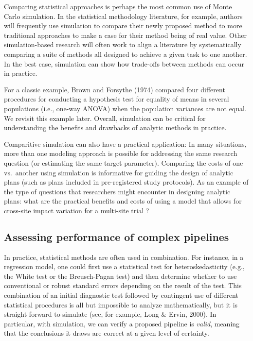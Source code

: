 \documentclass[
]{book}
\begin{document}
Comparing statistical approaches is perhaps the most common use of Monte Carlo simulation.
In the statistical methodology literature, for example, authors will frequently use simulation to compare their newly proposed method to more traditional approaches to make a case for their method being of real value.
Other simulation-based research will often work to align a literature by systematically comparing a suite of methods all designed to achieve a given task to one another.
In the best case, simulation can show how trade-offs between methods can occur in practice.

For a classic example, Brown and Forsythe (1974) compared four different procedures for conducting a hypothesis test for equality of means in several populations (i.e., one-way ANOVA) when the population variances are not equal.
We revisit this example later.
Overall, simulation can be critical for understanding the benefits and drawbacks of analytic methods in practice.

Comparitive simulation can also have a practical application: In many situations, more than one modeling approach is possible for addressing the same research question (or estimating the same target parameter).
Comparing the costs of one vs.~another using simulation is informative for guiding the design of analytic plans (such as plans included in pre-registered study protocols).
As an example of the type of questions that researchers might encounter in designing analytic plans: what are the practical benefits and costs of using a model that allows for cross-site impact variation for a multi-site trial \citep{miratrix2021applied}?

\hypertarget{assessing-performance-of-complex-pipelines}{%
\subsection{Assessing performance of complex pipelines}\label{assessing-performance-of-complex-pipelines}}

In practice, statistical methods are often used in combination.
For instance, in a regression model, one could first use a statistical test for heteroskedasticity (e.g., the White test or the Breusch-Pagan test) and then determine whether to use conventional or robust standard errors depending on the result of the test. This combination of an initial diagnostic test followed by contingent use of different statistical procedures is all but impossible to analyze mathematically, but it is straight-forward to simulate (see, for example, Long \& Ervin, 2000).
In particular, with simulation, we can verify a proposed pipeline is \emph{valid}, meaning that the conclusions it draws are correct at a given level of certainty.
\end{document}
